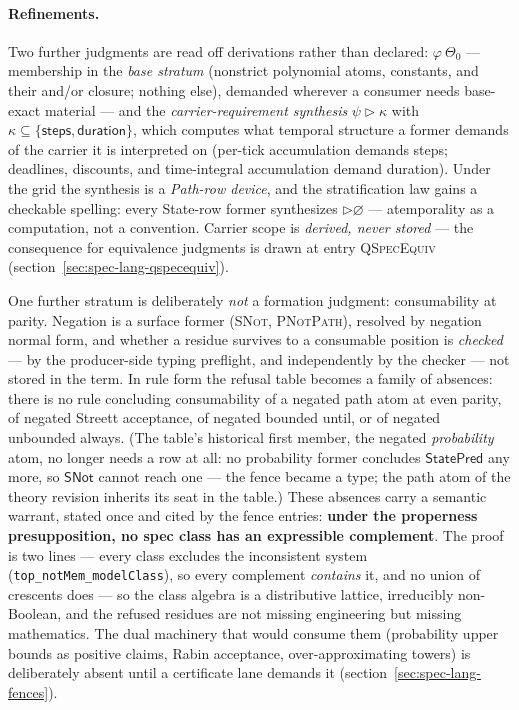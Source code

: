 \paragraph{Refinements.} Two further judgments are read off
derivations rather than declared:
$\varphi\ \Theta_0$ --- membership in the \emph{base stratum}
(nonstrict polynomial atoms, constants, and their and/or closure;
nothing else), demanded wherever a consumer needs base-exact
material --- and the \emph{carrier-requirement synthesis}
$\psi \rhd \kappa$ with
$\kappa \subseteq \{\mathsf{steps}, \mathsf{duration}\}$, which
computes what temporal structure a former demands of the carrier it
is interpreted on (per-tick accumulation demands steps; deadlines,
discounts, and time-integral accumulation demand duration). Under
the grid the synthesis is a \emph{Path-row device}, and the
stratification law gains a checkable spelling: every State-row
former synthesizes $\rhd \varnothing$ --- atemporality as a
computation, not a convention. Carrier
scope is \emph{derived, never stored} --- the consequence for
equivalence judgments is drawn at entry \textsc{QSpecEquiv}
(section~\ref{sec:spec-lang-qspecequiv}).

One further stratum is deliberately \emph{not} a formation judgment:
consumability at parity. Negation is a surface former
(\textsc{SNot}, \textsc{PNotPath}), resolved by negation normal
form, and whether a residue survives to a consumable position is
\emph{checked} --- by the producer-side typing preflight, and
independently by the checker --- not stored in the term. In rule
form the refusal table becomes a family of absences: there is no
rule concluding consumability of a negated path atom at even
parity, of negated Streett acceptance, of negated bounded until,
or of negated unbounded always. (The table's historical first
member, the negated \emph{probability} atom, no longer needs a row
at all: no probability former concludes $\mathsf{StatePred}$ any
more, so $\mathsf{SNot}$ cannot reach one --- the fence became a
type; the path atom of the theory revision inherits its seat in the
table.) These absences carry a semantic
warrant, stated once and cited by the fence entries: \textbf{under
the properness presupposition, no spec class has an expressible
complement}. The proof is two lines --- every class excludes the
inconsistent system (\texttt{top\_notMem\_modelClass}), so every
complement \emph{contains} it, and no union of crescents does ---
so the class algebra is a distributive lattice, irreducibly
non-Boolean, and the refused residues are not missing engineering
but missing mathematics. The dual machinery that would consume them
(probability upper bounds as positive claims, Rabin acceptance,
over-approximating towers) is deliberately absent until a
certificate lane demands it
(section~\ref{sec:spec-lang-fences}).

